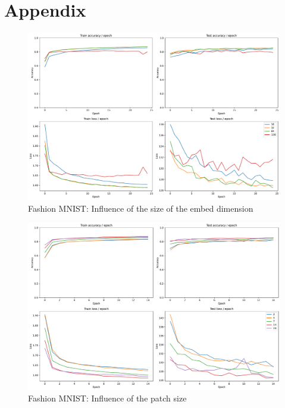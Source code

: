 \chapter{Appendix}

\begin{figure}[H]
    \centering
    \includegraphics*[width=\textwidth]{figs/Transformers/fashion-MNIST/embed_dim_influence_25.pdf}
    \caption{Fashion MNIST: Influence of the size of the embed dimension}
    \label{fig:fashion:embed_dim_influence}
\end{figure}

\begin{figure}[H]
    \centering
    \includegraphics*[width=\textwidth]{figs/Transformers/fashion-MNIST/patch_size_influence.pdf}
    \caption{Fashion MNIST: Influence of the patch size}
    \label{fig:fashion:patch_size_influence}
\end{figure}


